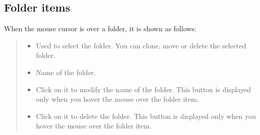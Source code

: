 \documentclass[letterpaper,10pt,english]{sphinxmanual}
\begin{document}
\subsection{Folder items}
\label{\detokenize{discovery/part03/workspace_management:folders}}\label{\detokenize{discovery/part03/workspace_management:id3}}
When the mouse cursor is over a folder, it is shown as follows:
\begin{quote}

\begin{figure}[H]
\centering

\noindent{}
\end{figure}
\begin{itemize}
\item {} 
 Used to select the folder. You can clone, move or delete the selected folder.

\item {} 
 Name of the folder.

\item {} 
 Click on it to modify the name of the folder. This button is displayed only when you hover the mouse over the folder item.

\item {} 
 Click on it to delete the folder. This button is displayed only when you hover the mouse over the folder item.

\end{itemize}
\end{quote}
\end{document}
